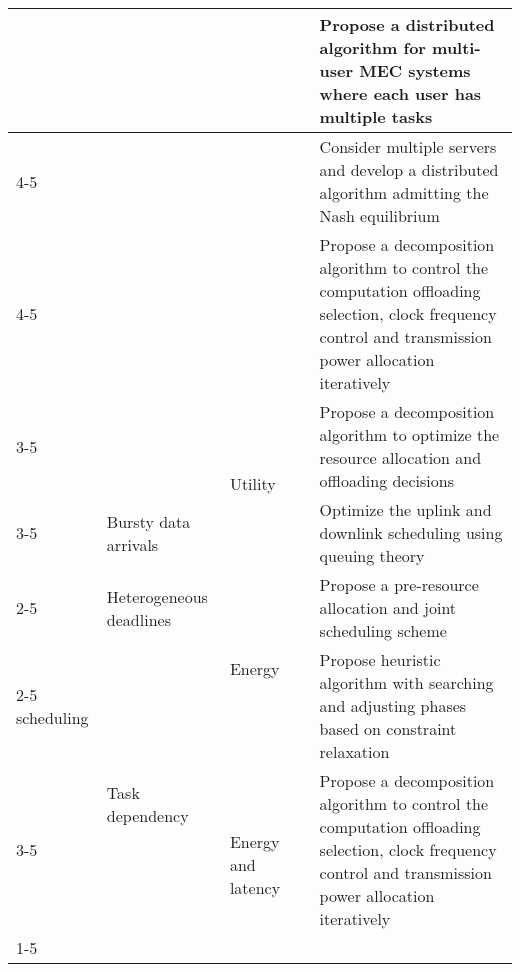 \documentclass[journal]{IEEEtran}
\begin{document}
\begin{table*}[h!]
{\begin{tabular}{ | p{2.1cm}|  p{2.1cm}|  p{2.5cm}| p{1.6cm}|  p{7cm}|}
    & & & \cite{MHChen1610} & Propose a distributed algorithm for multi-user MEC systems where each user has multiple tasks \\ \cline{4-5}
  & & & \cite{ma2015game} & Consider multiple servers and develop a distributed algorithm admitting the Nash equilibrium \\ \cline{4-5}
  & & &  \cite{guo2016energy } & Propose a decomposition algorithm  to control the computation offloading selection, clock frequency control and transmission power allocation iteratively \\ \cline{3-5}
  &  & \multirow{2}{*}{Utility} & \cite{lyumulti:2016:ProxiCloud} & Propose a decomposition algorithm  to optimize the resource allocation and offloading decisions\\  \cline{3-5}


 \hline
 \multirow{7}{*}{MEC server} & Bursty data arrivals %
  &  \multirow{2}{*}{Latency} & \cite{molina2014joint} & Optimize the uplink and downlink scheduling using queuing theory \\ \cline{2-5}
  & Heterogeneous deadlines & \multirow{2}{*}{Energy} & \cite{yu2016joint} & Propose a pre-resource allocation and joint scheduling scheme \\ \cline{2-5}
 scheduling & \multirow{4}{*}{Task dependency} &\multirow{2}{*}{Latency} & \cite{yang2015multi} &  Propose heuristic algorithm with searching and adjusting phases based on constraint relaxation \\ \cline{3-5}
  & & \multirow{2}{*}{Energy and latency}& \cite{guo2016energy} & Propose a decomposition algorithm  to control the computation offloading selection, clock frequency control and transmission power allocation iteratively \\ \cline{1-5}




\end{tabular}}
\end{table*}
\end{document}
